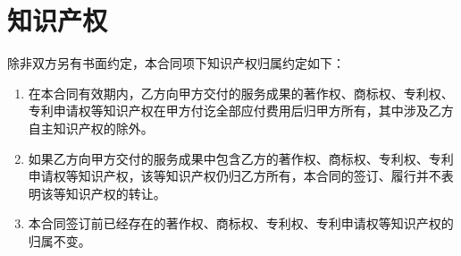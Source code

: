 \section{知识产权}
除非双方另有书面约定，本合同项下知识产权归属约定如下：

\begin{enumerate}
  \item  在本合同有效期内，乙方向甲方交付的服务成果的著作权、商标权、专利权、专利申请权等知识产权在甲方付讫全部应付费用后归甲方所有，其中涉及乙方自主知识产权的除外。
  \item 如果乙方向甲方交付的服务成果中包含乙方的著作权、商标权、专利权、专利申请权等知识产权，该等知识产权仍归乙方所有，本合同的签订、履行并不表明该等知识产权的转让。
  \item 本合同签订前已经存在的著作权、商标权、专利权、专利申请权等知识产权的归属不变。
\end{enumerate}
